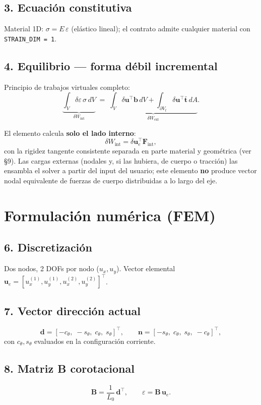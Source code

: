 \documentclass[11pt,letterpaper,oneside]{report}
\begin{document}
\subsection{3. Ecuación constitutiva}
Material 1D: $\sigma = E\,\varepsilon$ (elástico lineal); el contrato admite cualquier material con \texttt{STRAIN\_DIM = 1}.

\subsection{4. Equilibrio --- forma débil incremental}
Principio de trabajos virtuales completo:
\[
\underbrace{\int_V \delta\varepsilon\, \sigma\, dV}_{\delta W_{\text{int}}} \;=\; \underbrace{\int_V \delta\mathbf u^\top \mathbf b\, dV + \int_{\partial V_t} \delta\mathbf u^\top \bar{\mathbf t}\, dA}_{\delta W_{\text{ext}}}.
\]

El elemento calcula \textbf{solo el lado interno}:
\[
\delta W_{\text{int}} = \delta\mathbf u_e^\top \mathbf F_{\text{int}},
\]
con la rigidez tangente consistente separada en parte material y geométrica (ver §9). Las cargas externas (nodales y, si las hubiera, de cuerpo o tracción) las ensambla el solver a partir del input del usuario; este elemento \textbf{no} produce vector nodal equivalente de fuerzas de cuerpo distribuidas a lo largo del eje.


\section{Formulación numérica (FEM)}

\subsection{6. Discretización}
Dos nodos, 2 DOFs por nodo ($u_x, u_y$). Vector elemental $\mathbf u_e = [u_x^{(1)}, u_y^{(1)}, u_x^{(2)}, u_y^{(2)}]^\top$.

\subsection{7. Vector dirección actual}
\[
\mathbf d = [-c_\theta,\; -s_\theta,\; c_\theta,\; s_\theta]^\top, \qquad \mathbf n = [-s_\theta,\; c_\theta,\; s_\theta,\; -c_\theta]^\top,
\]
con $c_\theta, s_\theta$ evaluados en la configuración corriente.

\subsection{8. Matriz B corotacional}
\[
\mathbf B = \frac{1}{L_0}\,\mathbf d^\top, \qquad \varepsilon = \mathbf B\, \mathbf u_e.
\]
\end{document}
